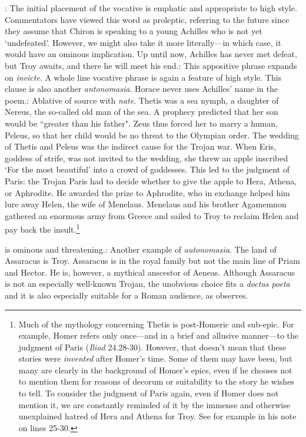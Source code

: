 : The initial placement of the vocative is emphatic and appropriate to high style.  Commentators have viewed this word as proleptic, referring to the future since they assume that Chiron is speaking to a young Achilles who is not yet `undefeated'.  However, we might also take it more literally---in which case, it would have an ominous implication.  Up until now, Achilles has never met defeat, but Troy awaits, and there he will meet his end.\indent{}: This appositive phrase expands on \textit{invicte}.  A whole line vocative phrase is again a feature of high style.  This clause is also another \textit{antonomasia}.  Horace never uses Achilles' name in the poem.\indent{}: Ablative of source with \textit{nate}.  Thetis was a sea nymph, a daughter of Nereus, the so-called old man of the sea.   A prophecy predicted that her son would be ``greater than his father".  Zeus thus forced her to marry a human, Peleus, so that her child would be no threat to the Olympian order.  The wedding of Thetis and Peleus was the indirect cause for the Trojan war.  When Eris, goddess of strife, was not invited to the wedding, she threw an apple inscribed `For the most beautiful' into a crowd of goddesses.  This led to the judgment of Paris: the Trojan Paris had to decide whether to give the apple to Hera, Athena, or Aphrodite.  He awarded the prize to Aphrodite, who in exchange helped him lure away Helen, the wife of Menelaus.  Menelaus and his brother Agamemnon gathered an enormous army from Greece and sailed to Troy to reclaim Helen and pay back the insult.\footnote{Much of the mythology concerning Thetis is post-Homeric and sub-epic.  For example, Homer refers only once---and in a brief and allusive manner---to the judgment of Paris (\textit{Iliad} 24.28-30).  However, that doesn't mean that these stories were \textit{invented} after Homer's time.  Some of them may have been, but many are clearly in the background of Homer's epics, even if he chooses not to mention them for reasons of decorum or suitability to the story he wishes to tell.  To consider the judgment of Paris again, even if Homer does not mention it, we are constantly reminded of it by the immense and otherwise unexplained hatred of Hera and Athena for Troy.  See for example \citet[88]{macleod1982} in his note on lines 25-30.}


 is ominous and threatening.\indent{}: Another example of \textit{autonomasia}.  The land of Assaracus is Troy.  Assaracus is in the royal family but not the main line of Priam and Hector.  He is, however, a mythical anscestor of Aeneas.  Although Assaracus is not an especially well-known Trojan, the unobvious choice fits a \textit{doctus poeta} and it is also especially suitable for a Roman audience, as \citet[223]{mankin1995} observes.

